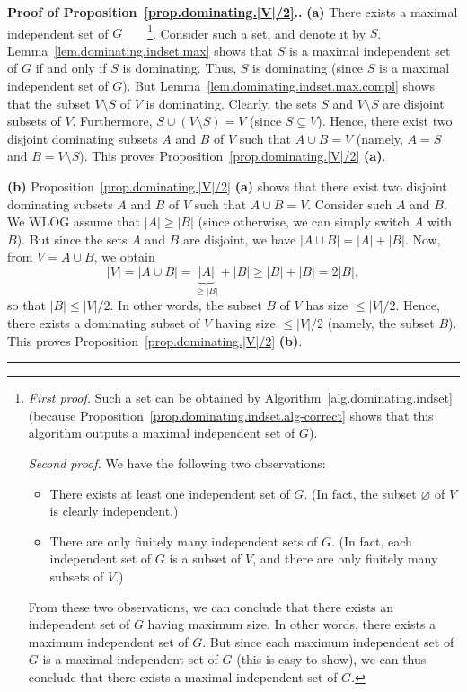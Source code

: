 \documentclass[numbers=enddot,12pt,final,onecolumn,notitlepage]{scrartcl}%
\theoremstyle{definition}
\newenvironment{proof}[1][Proof]{\noindent\textbf{#1.} }{\ \rule{0.5em}{0.5em}}
\newcommand{\abs}[1]{\left| #1 \right|}
\newcommand{\tup}[1]{\left( #1 \right)}
\begin{document}
\begin{proof}[Proof of Proposition~\ref{prop.dominating.|V|/2}.]
\textbf{(a)} There exists a maximal independent set of
$G$\ \ \ \ \footnote{\textit{First proof.} Such a set can be obtained
by Algorithm~\ref{alg.dominating.indset} (because
Proposition~\ref{prop.dominating.indset.alg-correct} shows that this
algorithm outputs a maximal independent set of $G$).

\textit{Second proof.} We have the following two observations:
\begin{itemize}
\item There exists at least one independent set of $G$.
(In fact, the subset $\varnothing$ of $V$ is clearly independent.)
\item There are only finitely many independent sets of $G$. (In fact,
each independent set of $G$ is a subset of $V$, and there are only
finitely many subsets of $V$.)
\end{itemize}
From these two observations, we can conclude that there exists an
independent set of $G$ having maximum size. In other words, there
exists a maximum independent set of $G$. But since each maximum
independent set of $G$ is a maximal independent set of $G$ (this is
easy to show), we can thus conclude that there exists a maximal
independent set of $G$.}. Consider such a set, and denote it by $S$.
Lemma~\ref{lem.dominating.indset.max} shows that $S$ is a maximal
independent set of $G$ if and only if $S$ is dominating. Thus,
$S$ is dominating (since $S$ is a maximal
independent set of $G$).
But Lemma~\ref{lem.dominating.indset.max.compl} shows that
the subset $V \setminus S$ of $V$ is dominating. Clearly, the sets
$S$ and $V \setminus S$ are disjoint subsets of $V$. Furthermore,
$S \cup \tup{V \setminus S} = V$ (since $S \subseteq V$). Hence,
there exist two disjoint dominating subsets $A$ and $B$
of $V$ such that $A \cup B = V$ (namely, $A = S$ and
$B = V \setminus S$). This proves
Proposition~\ref{prop.dominating.|V|/2} \textbf{(a)}.

\textbf{(b)} Proposition~\ref{prop.dominating.|V|/2} \textbf{(a)}
shows that there exist two disjoint dominating subsets $A$ and $B$
of $V$ such that $A \cup B = V$. Consider such $A$ and $B$.
We WLOG assume that $\abs{A} \geq \abs{B}$ (since otherwise, we can
simply switch $A$ with $B$). But since the sets $A$ and $B$ are
disjoint, we have $\abs{A \cup B} = \abs{A} + \abs{B}$. Now,
from $V = A \cup B$, we obtain
\[
\abs{V} = \abs{A \cup B}
= \underbrace{\abs{A}}_{\geq \abs{B}} + \abs{B}
\geq \abs{B} + \abs{B}
= 2 \abs{B} ,
\]
so that $\abs{B} \leq \abs{V} / 2$. In other words, the subset $B$ of
$V$ has size $\leq \abs{V} / 2$. Hence, there exists a dominating
subset of $V$ having size $\leq \abs{V}/2$ (namely, the subset $B$).
This proves Proposition~\ref{prop.dominating.|V|/2} \textbf{(b)}.
\end{proof}
\end{document}
